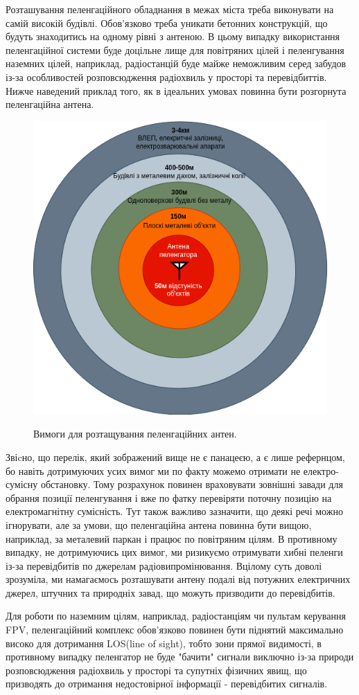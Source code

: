 \documentclass{article}
\begin{document}
Розташування пеленгаційного обладнання в межах міста треба виконувати на самій високій будівлі. Обов'язково треба уникати бетонних конструкцій, що будуть знаходитись на одному рівні з антеною. В цьому випадку використання пеленгаційної системи буде доцільне лище для повітряних цілей і пеленгування наземних цілей, наприклад, радіостанцій буде майже неможливим серед забудов із-за особливостей розповсюдження радіохвиль у просторі та перевідбиттів. Нижче наведений приклад того, як в ідеальних умовах повинна бути розгорнута пеленгаційна антена.

\begin{figure}[H]
	\centering
	{\includegraphics[width=0.5\linewidth]{images/obstacles_for_df_antenna.png}}
	\caption{\label{fig:triangulations} Вимоги для розтащування пеленгаційних антен.}
\end{figure}

Звіcно, що перелік, який зображений вище не є панацеєю, а є лише рефернцом, бо навіть дотримуючих усих вимог ми по факту можемо отримати не електро-сумісну обстановку. Тому розрахунок повинен враховувати зовнішні завади для обрання позиції пеленгування і вже по фатку перевіряти поточну позицію на електромагнітну сумісність. Тут також важливо зазначити, що деякі речі можно ігнорувати, але за умови, що пеленгаційна антена повинна бути вищою, наприклад, за металевий паркан і працює по повітряним цілям. В противному випадку, не дотримуючись цих вимог, ми ризикуємо отримувати хибні пеленги із-за перевідбитів по джерелам радіовипромінювання. Вцілому суть доволі зрозуміла, ми намагаємось розташувати антену подалі від потужних електричних джерел, штучних та природніх завад, що можуть призводити до перевідбитів. 

Для роботи по наземним цілям, наприклад, радіостанціям чи пультам керування FPV, пеленгаційний комплекс обов'язково повинен бути піднятий максимально високо для дотримання LOS(line of sight), тобто зони прямої видимості, в противному випадку пеленгатор не буде "бачити" сигнали виключно із-за природи розповсюдження радіохвиль у просторі та супутніх фізичних явищ, що призводять до отримання недостовірної інформації - перевідбитих сигналів.
\end{document}
